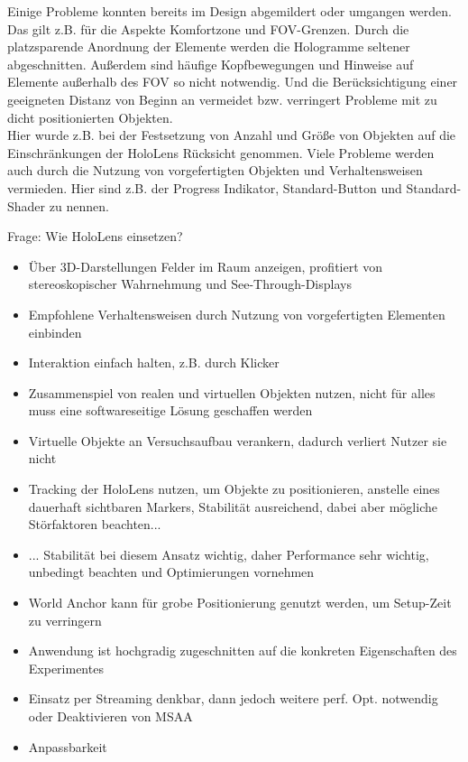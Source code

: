Einige Probleme konnten bereits im Design abgemildert oder umgangen werden. Das gilt z.B. für die Aspekte Komfortzone und FOV-Grenzen. Durch die platzsparende Anordnung der Elemente werden die Hologramme seltener abgeschnitten. Außerdem sind häufige Kopfbewegungen und Hinweise auf Elemente außerhalb des FOV so nicht notwendig. Und die Berücksichtigung einer geeigneten Distanz von Beginn an vermeidet bzw. verringert Probleme mit zu dicht positionierten Objekten.\\

Hier wurde z.B. bei der Festsetzung von Anzahl und Größe von Objekten auf die Einschränkungen der HoloLens Rücksicht genommen. Viele Probleme werden auch durch die Nutzung von vorgefertigten Objekten und Verhaltensweisen vermieden. Hier sind z.B. der Progress Indikator, Standard-Button und Standard-Shader zu nennen.

Frage: Wie HoloLens einsetzen?

\begin{itemize}
	\item Über 3D-Darstellungen Felder im Raum anzeigen, profitiert von stereoskopischer Wahrnehmung und See-Through-Displays
	\item Empfohlene Verhaltensweisen durch Nutzung von vorgefertigten Elementen einbinden
	\item Interaktion einfach halten, z.B. durch Klicker
	\item Zusammenspiel von realen und virtuellen Objekten nutzen, nicht für alles muss eine softwareseitige Lösung geschaffen werden
	\item Virtuelle Objekte an Versuchsaufbau verankern, dadurch verliert Nutzer sie nicht
	\item Tracking der HoloLens nutzen, um Objekte zu positionieren, anstelle eines dauerhaft sichtbaren Markers, Stabilität ausreichend, dabei aber mögliche Störfaktoren beachten...
	\item ... Stabilität bei diesem Ansatz wichtig, daher Performance sehr wichtig, unbedingt beachten und Optimierungen vornehmen
	\item World Anchor kann für grobe Positionierung genutzt werden, um Setup-Zeit zu verringern
	\item Anwendung ist hochgradig zugeschnitten auf die konkreten Eigenschaften des Experimentes
	\item Einsatz per Streaming denkbar, dann jedoch weitere perf. Opt. notwendig oder Deaktivieren von MSAA
	\item Anpassbarkeit
\end{itemize}


